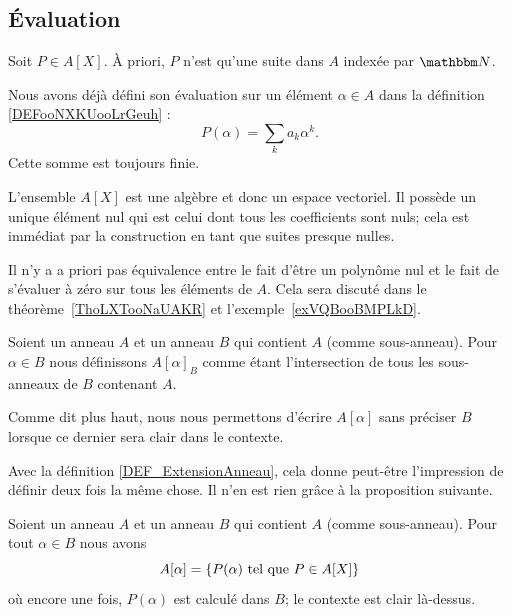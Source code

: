 \subsection{Évaluation}

Soit \( P\in A[X]\). À priori, \( P\) n'est qu'une suite dans \( A\) indexée par \( \eN\). 


Nous avons déjà défini son évaluation sur un élément \( \alpha\in A\) dans la définition \ref{DEFooNXKUooLrGeuh} :
\begin{equation}
    P(\alpha)=\sum_ka_k\alpha^k.
\end{equation}
Cette somme est toujours finie.

\begin{normaltext}      \label{NORMooQFTJooLBcPxl}
    L'ensemble \( A[X]\) est une algèbre et donc un espace vectoriel. Il possède un unique élément nul qui est celui dont tous les coefficients sont nuls; cela est immédiat par la construction en tant que suites presque nulles.
\end{normaltext}

Il n'y a a priori pas équivalence entre le fait d'être un polynôme nul et le fait de s'évaluer à zéro sur tous les éléments de \( A\). Cela sera discuté dans le théorème~\ref{ThoLXTooNaUAKR} et l'exemple~\ref{exVQBooBMPLkD}.

\begin{definition}      \label{DEFooRFBFooKCXQsv}
    Soient un anneau \( A\) et un anneau \( B\) qui contient \( A\) (comme sous-anneau). Pour \( \alpha\in B\) nous définissons \( A[\alpha]_B\) comme étant l'intersection de tous les sous-anneaux de \( B\) contenant \( A\).
\end{definition}
Comme dit plus haut, nous nous permettons d'écrire \( A[\alpha]\) sans préciser \( B\) lorsque ce dernier sera clair dans le contexte.

Avec la définition \ref{DEF_ExtensionAnneau}, cela donne peut-être l'impression de définir deux fois la même chose. Il n'en est rien grâce à la proposition suivante.

\begin{proposition}     \label{PROPooPMNSooOkHOxJ}
    Soient un anneau \( A\) et un anneau \( B\) qui contient \( A\) (comme sous-anneau). Pour tout \( \alpha\in B\) nous avons
    \begin{equation}
        A[\alpha]=\{ P(\alpha)\text{ tel que } P\in A[X] \}
    \end{equation}
    où encore une fois, \( P(\alpha)\) est calculé dans \( B\); le contexte est clair là-dessus.
\end{proposition}

